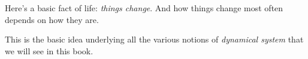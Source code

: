 \documentclass[DynamicalBook]{subfiles}
\begin{document}
%


\setcounter{chapter}{0}%


\chapter{}


Here's a basic fact of life: \emph{things change}. And how things change most
often depends on how they are.

This is the basic idea underlying all the various notions of \emph{dynamical
  system} that we will see in this book. 
\end{document}
